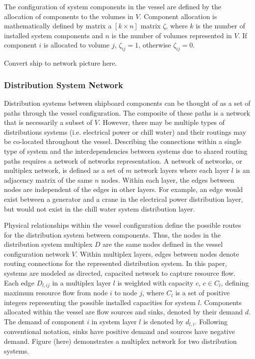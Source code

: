 \documentclass[preprint,12pt]{elsarticle}
\begin{document}
The configuration of system components in the vessel are defined by the allocation of components to the volumes in $V$. Component allocation is mathematically defined by matrix a $[k \times n]$ matrix $\zeta$, where $k$ is the number of installed system components and $n$ is the number of volumes represented in $V$. If component $i$ is allocated to volume $j$, $\zeta_{ij}=1$, otherwise $\zeta_{ij}=0$.   

Convert ship to network picture here.

 

\subsubsection{Distribution System Network} \label{sec:sysmodel}
Distribution systems between shipboard components can be thought of as a set of paths through the vessel configuration. The composite of these paths is a network that is necessarily a subset of $V$. However, there may be multiple types of distributions systems (i.e. electrical power or chill water) and their routings may be co-located throughout the vessel. Describing the connections within a single type of system and the interdependencies between systems due to shared routing paths requires a network of networks representation. A network of networks, or multiplex network, is defined as a set of $m$ network layers where each layer $l$ is an adjacency matrix of the same $n$ nodes. Within each layer, the edges between nodes are independent of the edges in other layers. For example, an edge would exist between a generator and a crane in the electrical power distribution layer, but would not exist in the chill water system distribution layer. 

Physical relationships within the vessel configuration define the possible routes for the distribution system between components. Thus, the nodes in the distribution system multiplex $D$ are the same nodes defined in the vessel configuration network $V$. Within multiplex layers, edges between nodes denote routing connections for the represented distribution system. In this paper, systems are modeled as directed, capacited network to capture resource flow. Each edge $D_{l,ij}$ in a multiplex layer $l$ is weighted with capacity $c$, $c \in C_l$, defining maximum resource flow from node $i$ to node $j$, where $C_l$ is a set of positive integers representing the possible installed capacities for system $l$. Components allocated within the vessel are flow sources and sinks, denoted by their demand $d$. The demand of component $i$ in system layer $l$ is denoted by $d_{l,i}$. Following conventional notation, sinks have positive demand and sources have negative demand. Figure (here) demonstrates a multiplex network for two distribution systems.
\end{document}

